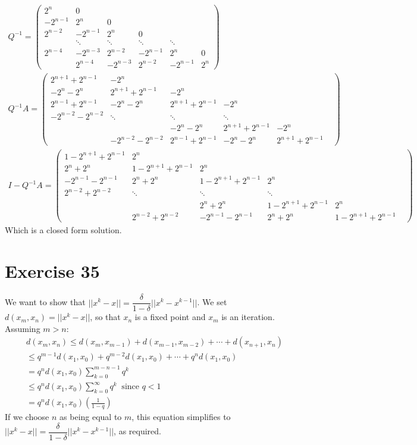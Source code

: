 \begin{gather*}
Q^{-1} = \left( \begin{array}{cccccc}
2^n & 0 &  & & & \\
-2^{n-1} & 2^n & 0 &  & &  \\
2^{n-2} & -2^{n-1} & 2^n & 0 & &  \\
 & \ddots & \ddots & \ddots & \ddots & \\
2^{n-4}  & -2^{n-3} & 2^{n-2} &   -2^{n-1} & 2^n & 0\\
 & 2^{n-4} & -2^{n-3} & 2^{n-2} &  -2^{n-1} & 2^n
\end{array} \right)
\\
Q^{-1} A = 
\left( \begin{array}{cccccc}
2^{n+1} + 2^{n-1} & -2^{n} &  & & & \\
-2^n - 2^n & 2^{n+1} + 2^{n-1} & -2^{n} &  & &  \\
2^{n-1} + 2^{n-1} & -2^n - 2^n & 2^{n+1} +2^{n-1} & -2^{n} & &  \\
-2^{n-2} - 2^{n-2} & \ddots & \ddots & \ddots &  \\
  &   &   -2^n - 2^n & 2^{n+1} +2^{n-1} & -2^{n}\\
 &   -2^{n-2} - 2^{n-2} & 2^{n-1} + 2^{n-1} &  -2^n - 2^n & 2^{n+1} + 2^{n-1}
\end{array} \right)
\\
I - Q^{-1}A = 
\left( \begin{array}{cccccc}
1 - 2^{n+1} + 2^{n-1} & 2^{n} &  & & & \\
2^n + 2^n & 1 - 2^{n+1} + 2^{n-1} & 2^{n} &  & &  \\
-2^{n-1} - 2^{n-1} & 2^n + 2^n & 1 - 2^{n+1} +2^{n-1} & 2^{n} & &  \\
2^{n-2} + 2^{n-2} & \ddots & \ddots & \ddots &  \\
  &   &   2^n + 2^n & 1 - 2^{n+1} +2^{n-1} &  2^{n}\\
 &   2^{n-2} + 2^{n-2} & - 2^{n-1} - 2^{n-1} &  2^n + 2^n & 1- 2^{n+1} + 2^{n-1}
\end{array} \right)
\end{gather*}
Which is a closed form solution.

\section{Exercise 35}
We want to show that $||x^k -x || = \dfrac{\delta}{1-\delta} || x^k - x^{k-1} ||$.
We set $d(x_m,x_n) = ||x^k -x ||$, so that $x_n$ is a fixed point and $x_m$ is an iteration.
Assuming $m > n$:
\begin{gather*}
d(x_m, x_n)  \leq d(x_m, x_{m-1}) + d(x_{m-1}, x_{m-2}) + \cdots + d(x_{n+1}, x_n)   \\
 \leq q^{m-1}d(x_1, x_0) + q^{m-2}d(x_1, x_0) + \cdots + q^nd(x_1, x_0) \\
 = q^n d(x_1, x_0) \sum_{k=0}^{m-n-1} q^k \\
 \leq q^n d(x_1, x_0) \sum_{k=0}^\infty q^k \ \text{ since } q < 1\\
 = q^n d(x_1, x_0) \left ( \frac{1}{1-q} \right ) 
\end{gather*}
If we choose $n$ as being equal to $m$, this equation simplifies to $||x^k -x || = \dfrac{\delta}{1-\delta} || x^k - x^{k-1} ||$, as required.
